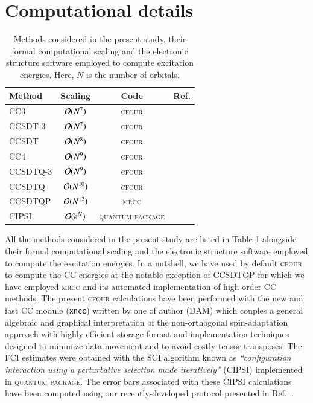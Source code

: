 \documentclass[aip,jcp,reprint,noshowkeys,superscriptaddress]{revtex4-1}
\newcommand{\QP}{\textsc{quantum package}}
\newcommand{\MRCC}{\textsc{mrcc}}
\newcommand{\CFOUR}{\textsc{cfour}}
\begin{document}
\section{Computational details}

\begin{table}
	\caption{Methods considered in the present study, their formal computational scaling and the electronic structure software employed to compute excitation energies.
	Here, $N$ is the number of orbitals.
	\label{tab:scaling}}
	\begin{ruledtabular}
	\begin{tabular}{lccc}
		Method	&	Scaling					&	Code		&	Ref.					\\
		\hline
		CC3			&	$\order*{N^{7}}$	&	\CFOUR		&	\onlinecite{cfour}		\\
		CCSDT-3		&	$\order*{N^{7}}$	&	\CFOUR		&	\onlinecite{cfour}		\\
		CCSDT		&	$\order*{N^{8}}$	&	\CFOUR		&	\onlinecite{cfour}		\\
		CC4			&	$\order*{N^{9}}$	&	\CFOUR		&	\onlinecite{cfour}		\\
		CCSDTQ-3	&	$\order*{N^{9}}$	&	\CFOUR		&	\onlinecite{cfour}		\\
		CCSDTQ		&	$\order*{N^{10}}$	&	\CFOUR		&	\onlinecite{cfour}		\\
		CCSDTQP		&	$\order*{N^{12}}$	&	\MRCC		&	\onlinecite{mrcc}		\\	
		CIPSI		&	$\order*{e^{N}}$	&	\QP			&	\onlinecite{qp2}		\\
	\end{tabular}
	\end{ruledtabular}
\end{table}

All the methods considered in the present study are listed in Table \ref{tab:scaling} alongside their formal computational scaling and the electronic structure software employed to compute the excitation energies.
In a nutshell, we have used by default {\CFOUR} to compute the CC energies at the notable exception of CCSDTQP for which we have employed {\MRCC} and its automated implementation of high-order CC methods.
The present {\CFOUR} calculations have been performed with the new and fast CC module (\texttt{xncc}) written by one of author (DAM) which couples a general algebraic
and graphical interpretation of the non-orthogonal spin-adaptation approach with highly efficient storage format and implementation techniques designed to minimize data movement and to avoid costly tensor transposes.
The FCI estimates were obtained with the SCI algorithm known as \textit{``configuration interaction using a perturbative selection made iteratively''} (CIPSI) implemented in {\QP}.
The error bars associated with these CIPSI calculations have been computed using our recently-developed protocol presented in Ref.~.
\end{document}
